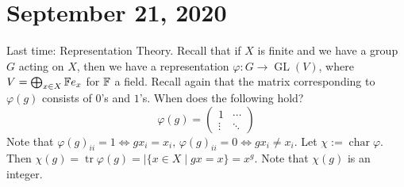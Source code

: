 \section{September 21, 2020}
Last time: Representation Theory. Recall that if $X$ is finite and we have a group $G$ acting on $X$, then we have a representation $\varphi \colon G \to \operatorname{GL}(V)$, where $V=\bigoplus_{x\in X}\mathbb{F} e_x$ for $\mathbb{F}$ a field. Recall again that the matrix corresponding to $\varphi (g)$ consists of $0$'s and $1$'s. When does the following hold? \[
    \varphi (g)=
    \begin{pmatrix}
        1 & \cdots \\
        \vdots & \ddots
    \end{pmatrix}
\] Note that $\varphi (g)_{ii}=1 \iff gx_i=x_i, \, \varphi (g)_{ii}=0\iff gx_i \neq x_i$. Let $\chi:=\operatorname{char}\varphi $. Then $\chi(g)=\operatorname{tr}\varphi (g)=| \{x\in X \mid gx=x\} =x^{g}$. Note that $\chi(g)$ is an integer.
